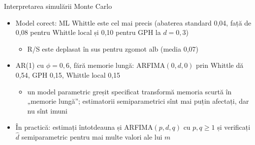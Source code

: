 \begin{frame}{Interpretarea simulării Monte Carlo}
\itemsize{\small}
\begin{itemize}
    \item Model corect: ML Whittle este cel mai precis (abaterea standard 0{,}04, față de 0{,}08 pentru Whittle local și 0{,}10 pentru GPH la $d = 0{,}3$)
    \begin{itemize}
        \item R/S este deplasat în sus pentru zgomot alb (media 0{,}07) 
    \end{itemize}
    \item AR(1) cu $\phi = 0{,}6$, fără memorie lungă: ARFIMA$(0,d,0)$ prin Whittle dă 0{,}54, GPH 0{,}15, Whittle local 0{,}15
    \begin{itemize}
        \item un model parametric greșit specificat transformă memoria scurtă în „memorie lungă”; estimatorii semiparametrici sînt mai puțin afectați, dar nu sînt imuni
    \end{itemize}
    \item În practică: estimați întotdeauna și ARFIMA$(p,d,q)$ cu $p, q \ge 1$ și verificați $\hat d$ semiparametric pentru mai multe valori ale lui $m$
\end{itemize}
\end{frame}

